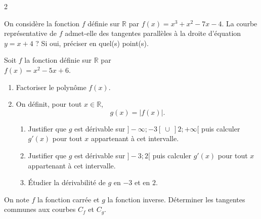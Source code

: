 \documentclass[a4paper,12pt]{article}
\begin{document}
\begin{multicols}{2}
    \begin{exercice}[title=Exercice 19 $\quad \star \star \star \quad$ { [Calculer, Représenter] }]{}{}
    On considère la fonction $f$ définie sur $\mathbb{R}$ par $f(x) = x^3 + x^2 - 7x - 4$. La courbe représentative de $f$ admet-elle des tangentes parallèles à la droite d’équation $y = x + 4$ ? Si oui, préciser en quel(s) point(s).
    \end{exercice}
    
    \begin{exercice}[title=Exercice 20 $\quad \star \star \star \quad$ { [Calculer, Raisonner] }]{}{}
    Soit $f$ la fonction définie sur $\mathbb{R}$ par \\$f(x) = x^2 - 5x + 6$.
    \begin{enumerate}
        \item Factoriser le polynôme $f(x)$.
        \item On définit, pour tout $x \in \mathbb{R}$, $$g(x) = |f(x)|.$$
        \begin{enumerate}
            \item Justifier que $g$ est dérivable sur $]-\infty; -3[\ \cup\ ]2; +\infty[$ puis calculer $g'(x)$ pour tout $x$ appartenant à cet intervalle.
            \item Justifier que $g$ est dérivable sur $]-3; 2[$ puis calculer $g'(x)$ pour tout $x$ appartenant à cet intervalle.
            \item Étudier la dérivabilité de $g$ en $-3$ et en $2$.
        \end{enumerate}
    \end{enumerate}
    \end{exercice}
    
    \begin{exercice}[title=Exercice 21 $\quad \star \star \star \quad$ { [Chercher, Calculer, Représenter] }]{}{}
    On note $f$ la fonction carrée et $g$ la fonction inverse. Déterminer les tangentes communes aux courbes $C_f$ et $C_g$.
    \end{exercice}
    
\end{multicols}
\end{document}
